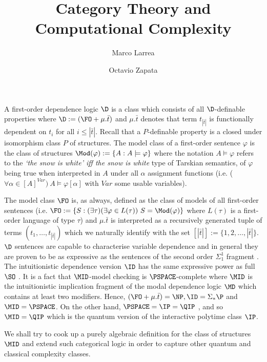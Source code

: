 

\title{Category Theory and \\ Computational Complexity}
\author{Marco Larrea \and Octavio Zapata}


\maketitle
A first-order dependence logic $\D$ is a class which consists of all $\D$-definable properties where $\D := (\FO + \mu.\bar{t})$ and $\mu.\bar{t}$ denotes that term $t_{|\bar{t}|}$ is functionally dependent on $t_{i}$ for all $i\leq |\bar{t}|$. Recall that a $P$-definable property is a closed under isomorphism class $P$ of structures. The model class of a first-order sentence $\varphi$ is the class of structures $\Mod(\varphi):=\{A:A\models\varphi\}$ where the notation $A\models\varphi$ refers to the \emph{`the snow is white' iff the snow is white} type of Tarskian semantics, of $\varphi$ being true when interpreted in $A$ under all $\alpha$ assignment functions (i.e. ($\forall\alpha\in [A]^{Var})\ A\models\varphi[\alpha]$ with $Var$ some usable variables). 

The model class $\FO$ is, as always, defined as the class of models of all first-order sentences (i.e. $\FO:= \{S:(\exists\tau)(\exists\varphi\in L(\tau))\ S=\Mod(\varphi)\}$ where $L(\tau)$ is a first-order language of type $\tau$) and $\mu.\bar{t}$ is interpreted as a recursively generated tuple of terms $(t_1,\dots,t_{|\bar{t}|})$ which we naturally identify with the set $[|\bar{t}|] := \{1,2,\dots,|\bar{t}|\}$. $\D$ sentences are capable to characterise variable dependence and in general they are proven to be as expressive as the sentences of the second order $\Sigma_1^1$ fragment \cite{dep}. The intuitionistic dependence version $\ID$ has the same expressive power as full $\SO$ \cite{dep}. It is a fact that $\MID$-model checking is $\PSPACE$-complete \cite{dep} where $\MID$ is the intuitionistic implication fragment of the modal dependence logic $\MD$ which contains at least two modifiers. Hence, $(\FO + \mu.\bar{t}) = \NP, \ID = \Sigma_{\ast}\P$ and $\MID = \PSPACE$.  On the other hand, $\PSPACE = \IP = \QIP$ \cite{qip}, and so $\MID = \QIP$ which is the quantum version of the interactive polytime class $\IP$.

We shall try to cook up a purely algebraic definition for the class of structures $\MID$ and extend such categorical logic in order to capture other quantum and classical complexity classes. 

